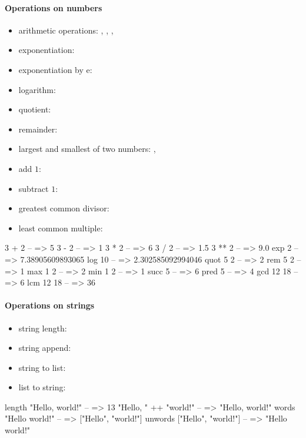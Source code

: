 \documentclass[a4paper,landscape,10pt]{article}
\begin{document}
\begin{multicols*}{2}
  \breakcolumn

  \paragraph{Operations on numbers}

  \begin{itemize}
    \item arithmetic operations: \ihaskell{+}, \ihaskell{-}, \ihaskell{*}, \ihaskell{/}
    \item exponentiation: \ihaskell{**}
    \item exponentiation by e: 
    \item logarithm: 
    \item quotient: 
    \item remainder: 
    \item largest and smallest of two numbers: , 
    \item add \(1\): 
    \item subtract \(1\): 
    \item greatest common divisor: 
    \item least common multiple: 
  \end{itemize}

  \begin{haskell}
3 + 2 -- => 5
3 - 2 -- => 1
3 * 2 -- => 6
3 / 2 -- => 1.5
3 ** 2 -- => 9.0
exp 2 -- => 7.38905609893065
log 10 -- => 2.302585092994046
quot 5 2 -- => 2
rem 5 2 -- => 1
max 1 2 -- => 2
min 1 2 -- => 1
succ 5 -- => 6
pred 5 -- => 4
gcd 12 18 -- => 6
lcm 12 18 -- => 36
\end{haskell}

  \paragraph{Operations on strings}

  \begin{itemize}
    \item string length: 
    \item string append: \ihaskell{++}
    \item string to list: 
    \item list to string: 
  \end{itemize}

  \begin{haskell}
length "Hello, world!" -- => 13
"Hello, " ++ "world!" -- => "Hello, world!"
words "Hello world!" -- => ["Hello", "world!"]
unwords ["Hello", "world!"] -- => "Hello world!"
\end{haskell}


\end{multicols*}
\end{document}
